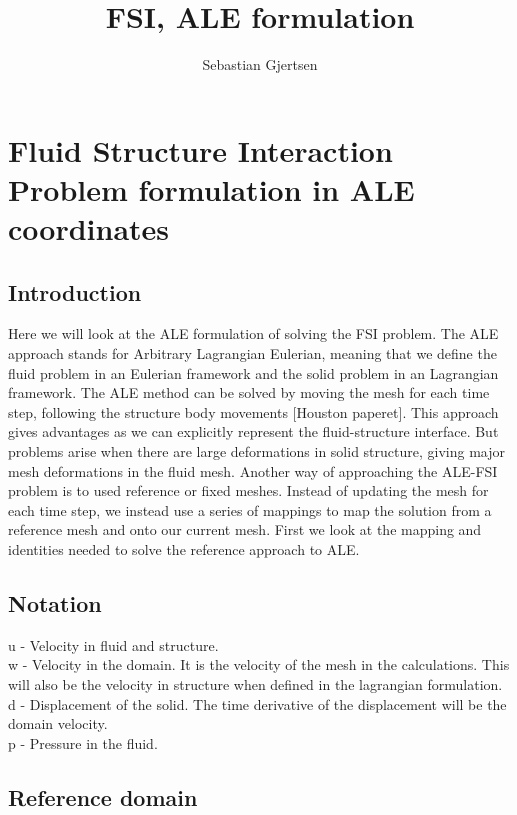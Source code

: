 
\usepackage{listings}
\usepackage{amsmath}
\title{FSI, ALE formulation}
\author{Sebastian Gjertsen}

\maketitle


\section*{Fluid Structure Interaction Problem formulation in ALE coordinates}
\subsection*{Introduction}
Here we will look at the ALE formulation of solving the FSI problem. The ALE approach stands for Arbitrary Lagrangian Eulerian, meaning that we define the fluid problem in an Eulerian framework and the solid problem in an Lagrangian framework. The ALE method can be solved by moving the mesh for each time step, following the structure body movements [Houston paperet]. This approach gives advantages as we can explicitly represent the fluid-structure interface. But problems arise when there are large deformations in solid structure, giving major mesh deformations in the fluid mesh. Another way of approaching the ALE-FSI problem is to used reference or fixed meshes. Instead of updating the mesh for each time step, we instead use a series of mappings to map the solution from a reference mesh and onto our current mesh. First we look at the mapping and identities needed to solve the reference approach to ALE.
\subsection*{Notation}
u - Velocity in fluid and structure. \\
w - Velocity in the domain. It is the velocity of the mesh in the calculations. This will also be the velocity in structure when defined in the lagrangian formulation. \\
d - Displacement of the solid. The time derivative of the displacement will be the domain velocity. \\
p - Pressure in the fluid. 

\subsection*{Reference domain}
